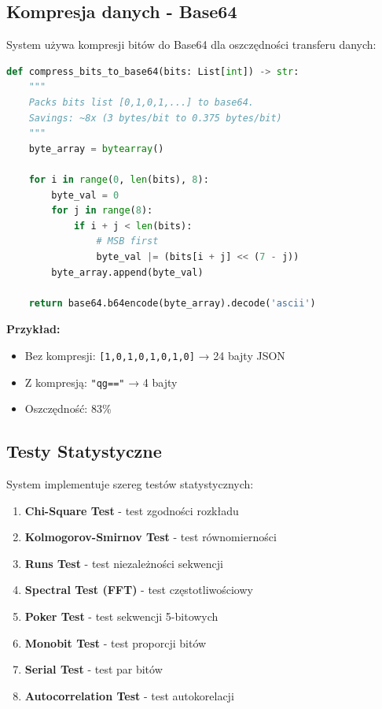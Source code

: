 \documentclass[12pt,a4paper]{article}
\begin{document}
\subsection{Kompresja danych - Base64}

System używa kompresji bitów do Base64 dla oszczędności transferu danych:

\begin{lstlisting}[language=Python, caption=Kompresja bitow]
def compress_bits_to_base64(bits: List[int]) -> str:
    """
    Packs bits list [0,1,0,1,...] to base64.
    Savings: ~8x (3 bytes/bit to 0.375 bytes/bit)
    """
    byte_array = bytearray()
    
    for i in range(0, len(bits), 8):
        byte_val = 0
        for j in range(8):
            if i + j < len(bits):
                # MSB first
                byte_val |= (bits[i + j] << (7 - j))
        byte_array.append(byte_val)
    
    return base64.b64encode(byte_array).decode('ascii')
\end{lstlisting}

\textbf{Przykład:}
\begin{itemize}
    \item Bez kompresji: \texttt{[1,0,1,0,1,0,1,0]} → 24 bajty JSON
    \item Z kompresją: \texttt{"qg=="} → 4 bajty
    \item Oszczędność: 83\%
\end{itemize}

\subsection{Testy Statystyczne}

System implementuje szereg testów statystycznych:

\begin{enumerate}
    \item \textbf{Chi-Square Test} - test zgodności rozkładu
    \item \textbf{Kolmogorov-Smirnov Test} - test równomierności
    \item \textbf{Runs Test} - test niezależności sekwencji
    \item \textbf{Spectral Test (FFT)} - test częstotliwościowy
    \item \textbf{Poker Test} - test sekwencji 5-bitowych
    \item \textbf{Monobit Test} - test proporcji bitów
    \item \textbf{Serial Test} - test par bitów
    \item \textbf{Autocorrelation Test} - test autokorelacji
\end{enumerate}
\end{document}

